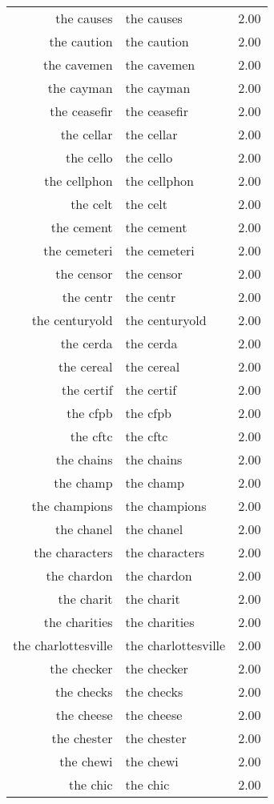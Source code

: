 \begin{table}[ht]
\begin{tabular}{rlr}
  the causes & the causes & 2.00 \\ 
  the caution & the caution & 2.00 \\ 
  the cavemen & the cavemen & 2.00 \\ 
  the cayman & the cayman & 2.00 \\ 
  the ceasefir & the ceasefir & 2.00 \\ 
  the cellar & the cellar & 2.00 \\ 
  the cello & the cello & 2.00 \\ 
  the cellphon & the cellphon & 2.00 \\ 
  the celt & the celt & 2.00 \\ 
  the cement & the cement & 2.00 \\ 
  the cemeteri & the cemeteri & 2.00 \\ 
  the censor & the censor & 2.00 \\ 
  the centr & the centr & 2.00 \\ 
  the centuryold & the centuryold & 2.00 \\ 
  the cerda & the cerda & 2.00 \\ 
  the cereal & the cereal & 2.00 \\ 
  the certif & the certif & 2.00 \\ 
  the cfpb & the cfpb & 2.00 \\ 
  the cftc & the cftc & 2.00 \\ 
  the chains & the chains & 2.00 \\ 
  the champ & the champ & 2.00 \\ 
  the champions & the champions & 2.00 \\ 
  the chanel & the chanel & 2.00 \\ 
  the characters & the characters & 2.00 \\ 
  the chardon & the chardon & 2.00 \\ 
  the charit & the charit & 2.00 \\ 
  the charities & the charities & 2.00 \\ 
  the charlottesville & the charlottesville & 2.00 \\ 
  the checker & the checker & 2.00 \\ 
  the checks & the checks & 2.00 \\ 
  the cheese & the cheese & 2.00 \\ 
  the chester & the chester & 2.00 \\ 
  the chewi & the chewi & 2.00 \\ 
  the chic & the chic & 2.00 \\ 

\end{tabular}
\end{table}
